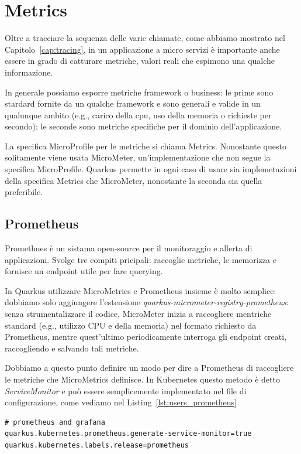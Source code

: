 \chapter{Metrics}
Oltre a tracciare la sequenza delle varie chiamate, come abbiamo mostrato nel Capitolo~\ref{cap:tracing}, in un applicazione a micro servizi è importante anche essere in grado di catturare metriche, valori reali che espimono una qualche informazione.

In generale possiamo esporre metriche framework o business: le prime sono stardard fornite da un qualche framework e sono generali e valide in un qualunque ambito (e.g., carico della cpu, uso della memoria o richieste per secondo); le seconde sono metriche specifiche per il dominio dell'applicazione.

\myskip

La specifica MicroProfile per le metriche si chiama Metrics. Nonostante questo solitamente viene usata MicroMeter, un'implementazione che non segue la specifica MicroProfile. Quarkus permette in ogni caso di usare sia implemetazioni della specifica Metrics che MicroMeter, nonostante la seconda sia quella preferibile.

\section{Prometheus}
\label{sec:prometheus}
Promethues è un sistama open-source per il monitoraggio e allerta di applicazioni. Svolge tre compiti pricipali: raccoglie metriche, le memorizza e fornisce un endpoint utile per fare querying.

\myskip

In Quarkus utilizzare MicroMetrics e Prometheus insieme è molto semplice: dobbiamo solo aggiungere l'estensione \textit{quarkus-micrometer-registry-prometheus}: senza strumentalizzare il codice, MicroMeter inizia a raccogliere mentriche standard (e.g., utilizzo CPU e della memoria) nel formato richiesto da Prometheus, mentre quest'ultimo periodicamente interroga gli endpoint creati, raccogliendo e salvando tali metriche.

Dobbiamo a questo punto definire un modo per dire a Prometheus di raccogliere le metriche che MicroMetrics definisce. In Kubernetes questo metodo è detto \textit{ServiceMonitor} e può essere semplicemente implementato nel file di configurazione, come vediamo nel Listing~\ref{lst:users_prometheus}
\begin{lstlisting}[caption=Prometheus configuration for \textit{users-service}, label=lst:users_prometheus]
# prometheus and grafana
quarkus.kubernetes.prometheus.generate-service-monitor=true
quarkus.kubernetes.labels.release=prometheus
\end{lstlisting}

